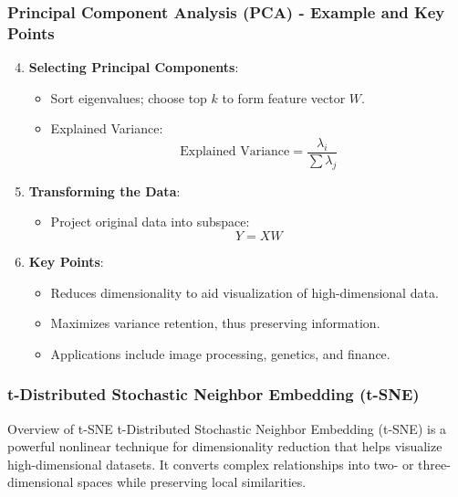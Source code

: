 \documentclass[aspectratio=169]{beamer}
\begin{document}
\begin{frame}[fragile]
    \frametitle{Principal Component Analysis (PCA) - Example and Key Points}
    \begin{enumerate}
        \setcounter{enumi}{3}
        \item \textbf{Selecting Principal Components}: 
        \begin{itemize}
            \item Sort eigenvalues; choose top \( k \) to form feature vector \( W \).
            \item Explained Variance: 
            \[
            \text{Explained Variance} = \frac{\lambda_i}{\sum \lambda_j}
            \]
        \end{itemize}

        \item \textbf{Transforming the Data}: 
        \begin{itemize}
            \item Project original data into subspace: 
            \[
            Y = X W
            \]
        \end{itemize}
        
        \item \textbf{Key Points}:
        \begin{itemize}
            \item Reduces dimensionality to aid visualization of high-dimensional data.
            \item Maximizes variance retention, thus preserving information.
            \item Applications include image processing, genetics, and finance.
        \end{itemize}
    \end{enumerate}
\end{frame}

\begin{frame}[fragile]
    \frametitle{t-Distributed Stochastic Neighbor Embedding (t-SNE)}
    \begin{block}{Overview of t-SNE}
        t-Distributed Stochastic Neighbor Embedding (t-SNE) is a powerful nonlinear technique for dimensionality reduction that helps visualize high-dimensional datasets. It converts complex relationships into two- or three-dimensional spaces while preserving local similarities.
    \end{block}
\end{frame}
\end{document}
